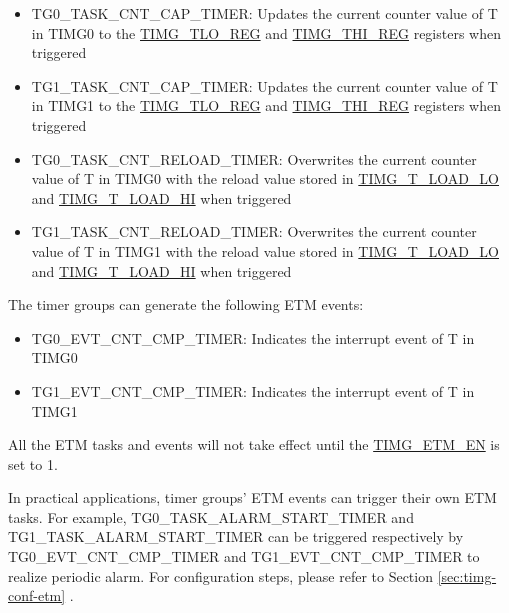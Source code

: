 \documentclass[main\_\_EN.tex]{subfiles}
\begin{document}
\begin{itemize}
\item TG0\_TASK\_CNT\_CAP\_TIMER: Updates the current counter value of T in TIMG0 to the \hyperref[regdesc:TIMGTXLOREG]{TIMG\_TLO\_REG} and \hyperref[regdesc:TIMGTXHIREG]{TIMG\_THI\_REG} registers when triggered
\item TG1\_TASK\_CNT\_CAP\_TIMER: Updates the current counter value of T in TIMG1 to the \hyperref[regdesc:TIMGTXLOREG]{TIMG\_TLO\_REG} and \hyperref[regdesc:TIMGTXHIREG]{TIMG\_THI\_REG} registers when triggered
\item TG0\_TASK\_CNT\_RELOAD\_TIMER: Overwrites the current counter value of T in TIMG0 with the reload value stored in \hyperref[fielddesc:TIMGTXLOADLO]{TIMG\_T\_LOAD\_LO} and \hyperref[fielddesc:TIMGTXLOADHI]{TIMG\_T\_LOAD\_HI} when triggered
\item TG1\_TASK\_CNT\_RELOAD\_TIMER: Overwrites the current counter value of T in TIMG1 with the reload value stored in \hyperref[fielddesc:TIMGTXLOADLO]{TIMG\_T\_LOAD\_LO} and \hyperref[fielddesc:TIMGTXLOADHI]{TIMG\_T\_LOAD\_HI} when triggered
\end{itemize}

The timer groups can generate the following ETM events:

\begin{itemize}
\item TG0\_EVT\_CNT\_CMP\_TIMER: Indicates the interrupt event of T in TIMG0
\item TG1\_EVT\_CNT\_CMP\_TIMER: Indicates the interrupt event of T  in TIMG1
\end{itemize}

All the ETM tasks and events will not take effect until the \hyperref[fielddesc:TIMGETMEN]{TIMG\_ETM\_EN} is set to 1.

In practical applications, timer groups' ETM events can trigger their own ETM tasks. For example, TG0\_TASK\_ALARM\_START\_TIMER and TG1\_TASK\_ALARM\_START\_TIMER can be triggered respectively by TG0\_EVT\_CNT\_CMP\_TIMER and TG1\_EVT\_CNT\_CMP\_TIMER to realize periodic alarm. For configuration steps, please refer to Section \ref{sec:timg-conf-etm} \textit{}.

\end{document}
